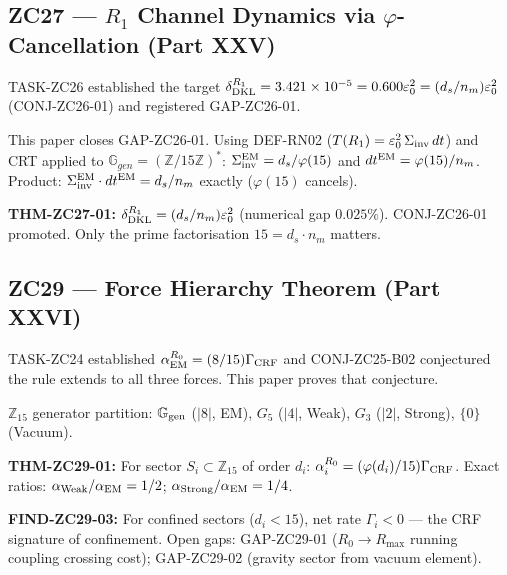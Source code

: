 \documentclass[11pt, a4paper]{article}
\newcommand{\Ggen}{\mathbb{G}_{\rm gen}}
\begin{document}
\subsection{ZC27 --- $R_1$ Channel Dynamics via $\varphi$-Cancellation (Part XXV)}

\begin{zcbox}[title={ZC27: THM-ZC27-01 --- CONJ-ZC26-01 Promoted}]
\sloppy
TASK-ZC26 established the target $\delta_{\rm DKL}^{R_1} = 3.421\times 10^{-5}
= 0.600\varepsilon_0^2 = (d_s/n_m)\varepsilon_0^2$ (CONJ-ZC26-01)
and registered GAP-ZC26-01.

This paper closes GAP-ZC26-01.
Using DEF-RN02 ($T(R_1) = \varepsilon_0^2\,\Sigma_{\rm inv}\,dt$)
and CRT applied to $\mathbb{G}_{gen} = (\mathbb{Z}/15\mathbb{Z})^*$:
$\Sigma_{\rm inv}^{\rm EM} = d_s/\varphi(15)$ and
$dt^{\rm EM} = \varphi(15)/n_m$.
Product: $\Sigma_{\rm inv}^{\rm EM}\cdot dt^{\rm EM} = d_s/n_m$ exactly
($\varphi(15)$ cancels).

\textbf{THM-ZC27-01:} $\delta_{\rm DKL}^{R_1} = (d_s/n_m)\varepsilon_0^2$
(numerical gap $0.025\%$). CONJ-ZC26-01 promoted.
Only the prime factorisation $15 = d_s \cdot n_m$ matters.
\end{zcbox}

\subsection{ZC29 --- Force Hierarchy Theorem (Part XXVI)}

\begin{zcbox}[title={ZC29: THM-ZC29-01 --- Universal Coupling Rule}]
\sloppy
TASK-ZC24 established $\alpha_{\rm EM}^{R_0} = (8/15)\Gamma_{\rm CRF}$
and CONJ-ZC25-B02 conjectured the rule extends to all three forces.
This paper proves that conjecture.

$\mathbb{Z}_{15}$ generator partition: $\Ggen$ ($|8|$, EM), $G_5$ ($|4|$, Weak),
$G_3$ ($|2|$, Strong), $\{0\}$ (Vacuum).

\textbf{THM-ZC29-01:} For sector $S_i \subset \mathbb{Z}_{15}$ of order $d_i$:
$\alpha_i^{R_0} = (\varphi(d_i)/15)\Gamma_{\rm CRF}$.
Exact ratios: $\alpha_{\rm Weak}/\alpha_{\rm EM} = 1/2$;
$\alpha_{\rm Strong}/\alpha_{\rm EM} = 1/4$.

\textbf{FIND-ZC29-03:} For confined sectors ($d_i < 15$), net rate
$\Gamma_i < 0$ --- the CRF signature of confinement.
Open gaps: GAP-ZC29-01 ($R_0\to R_{\max}$ running coupling crossing cost);
GAP-ZC29-02 (gravity sector from vacuum element).
\end{zcbox}
\end{document}
